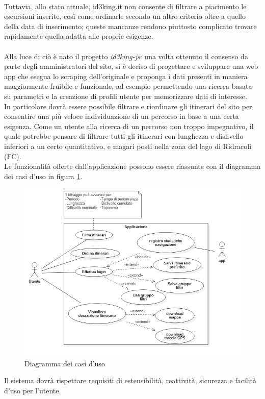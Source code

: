 \documentclass[11pt]{report}
\begin{document}
\\Tuttavia, allo stato attuale, id3king.it non consente di filtrare a piacimento le escursioni inserite, così come ordinarle secondo un altro criterio oltre a quello della data di inserimento; queste mancanze rendono piuttosto complicato trovare rapidamente quella adatta alle proprie esigenze.
\\\\Alla luce di ciò è nato il progetto \textit{id3king-js}: una volta ottenuto il consenso da parte degli amministratori del sito, si è deciso di progettare e sviluppare una web app che esegua lo scraping dell'originale e proponga i dati presenti in maniera maggiormente fruibile e funzionale, ad esempio permettendo una ricerca basata su parametri e la creazione di profili utente per memorizzare dati di interesse.
\\In particolare dovrà essere possibile filtrare e riordinare gli itinerari del sito per consentire una più veloce individuazione di un percorso in base a una certa esigenza.
Come un utente alla ricerca di un percorso non troppo impegnativo, il quale potrebbe pensare di filtrare tutti gli itinerari con lunghezza e dislivello inferiori a un certo quantitativo, e magari posti nella zona del lago di Ridracoli (FC).
\\Le funzionalità offerte dall'applicazione possono essere riassunte con il diagramma dei casi d'uso in figura \ref{use_case_diagram}.
\begin{figure}
	\centering
	\includegraphics[scale=0.5]{use_case_diagram}
	\caption{Diagramma dei casi d'uso \label{use_case_diagram}}
\end{figure}
Il sistema dovrà rispettare requisiti di estensibilità, reattività, sicurezza e facilità d'uso per l'utente.
\end{document}
